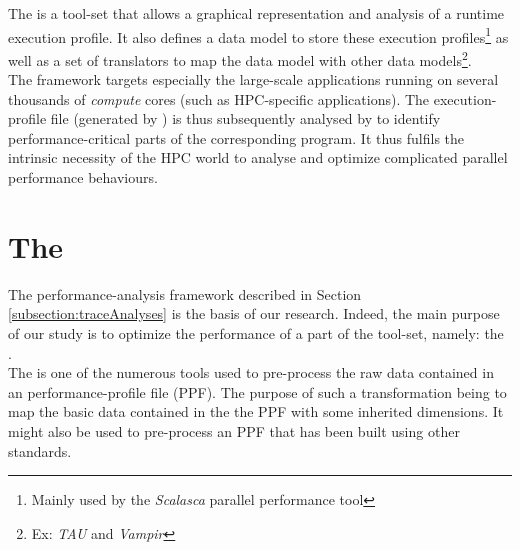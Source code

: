 		The \toolTraceAnalyzed\cite{saviankou2015cube} is a tool-set that allows a graphical representation and analysis of a runtime execution profile.   It also defines a data model to store these execution profiles\footnote{Mainly used by the \emph{Scalasca} parallel performance tool} as well as a set of translators to map the \toolTraceAnalyzed\space data model with other data models\footnote{Ex: \emph{TAU}\cite{shende2006tau} and \emph{Vampir}\cite{knupfer2008vampir}}.\\
		The \toolTraceAnalyzed\space framework targets especially the large-scale applications running on several thousands of \emph{compute} cores (such as HPC-specific applications).   The execution-profile file (generated by \toolProfiling) is thus subsequently analysed by \toolTraceAnalyzed\space to identify performance-critical parts of the corresponding program.   It thus fulfils the intrinsic necessity of the HPC world to analyse and optimize complicated parallel performance behaviours.

\section{The \toolTargetSoftware} \label{section:cubeRemapper_stateOfTheArt}
	The performance-analysis framework described in Section \ref{subsection:traceAnalyses} is the basis of our research.   Indeed, the main purpose of our study is to optimize the performance of a part of the \toolTraceAnalyzed\space tool-set, namely: the \toolTargetSoftware.\\

	The \toolTargetSoftware\space is one of the numerous \toolTraceAnalyzed\space tools used to pre-process the raw data contained in an performance-profile file (PPF).   The purpose of such a transformation being to map the basic data contained in the the PPF with some inherited dimensions.   It might also be used to pre-process an PPF that has been built using other standards.\\


